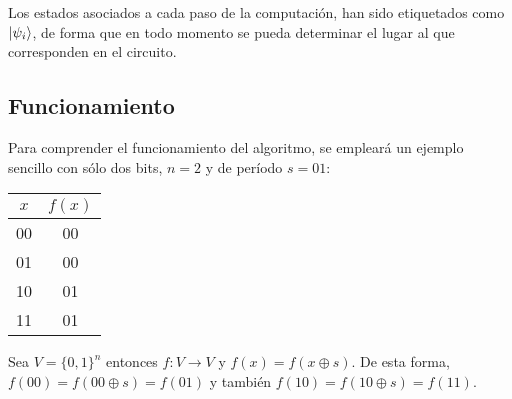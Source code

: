 \documentclass{article}
\theoremstyle{definition}
\begin{document}
Los estados asociados a cada paso de la computación, han sido etiquetados como 
$\ket{\psi_i}$, de forma que en todo momento se pueda determinar el lugar al que 
corresponden en el circuito.

\subsection{Funcionamiento}
Para comprender el funcionamiento del algoritmo, se empleará un ejemplo sencillo 
con sólo dos bits, $n=2$ y de período $s=01$:
%
\begin{center}
\begin{tabular}{|c|c|}
	\hline
	$x$ & $f(x)$ \\
	\hline
	00 & 00 \\
	01 & 00 \\
	10 & 01 \\
	11 & 01 \\
	\hline
\end{tabular}
\end{center}
%
Sea $V = \{0,1\}^n$ entonces $f:V\rightarrow V$ y $f(x) = f(x\oplus s)$. De esta 
forma, $f(00) = f(00 \oplus s) = f(01)$ y también $f(10) = f(10 \oplus s) = 
f(11)$.
\end{document}
